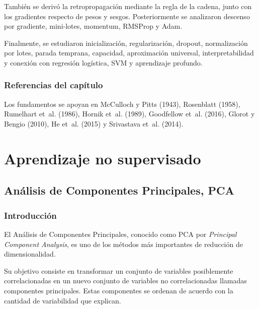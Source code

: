 \documentclass[
  spanish,
  10.5pt,
  letterpaper,
  DIV=11,
  numbers=noendperiod,
  oneside,
  open=any]{scrreprt}
\theoremstyle{definition}
\theoremstyle{definition}
\theoremstyle{plain}
\theoremstyle{remark}
\begin{document}
También se derivó la retropropagación mediante la regla de la cadena,
junto con los gradientes respecto de pesos y sesgos. Posteriormente se
analizaron descenso por gradiente, mini-lotes, momentum, RMSProp y Adam.

Finalmente, se estudiaron inicialización, regularización, dropout,
normalización por lotes, parada temprana, capacidad, aproximación
universal, interpretabilidad y conexión con regresión logística, SVM y
aprendizaje profundo.

\section*{Referencias del
capítulo}\label{referencias-del-capuxedtulo-15}


Los fundamentos se apoyan en McCulloch y Pitts (1943), Rosenblatt
(1958), Rumelhart et~al. (1986), Hornik et~al. (1989), Goodfellow et~al.
(2016), Glorot y Bengio (2010), He et~al. (2015) y Srivastava et~al.
(2014).

\part{Aprendizaje no supervisado}

\chapter{\texorpdfstring{Análisis de Componentes
Principales,
PCA}{Análisis de Componentes Principales, PCA}}\label{sec-pca}

\section*{Introducción}\label{introducciuxf3n-17}


El Análisis de Componentes Principales, conocido como PCA por
\emph{Principal Component Analysis}, es uno de los métodos más
importantes de reducción de dimensionalidad.

Su objetivo consiste en transformar un conjunto de variables
posiblemente correlacionadas en un nuevo conjunto de variables no
correlacionadas llamadas componentes principales. Estas componentes se
ordenan de acuerdo con la cantidad de variabilidad que explican.
\end{document}
